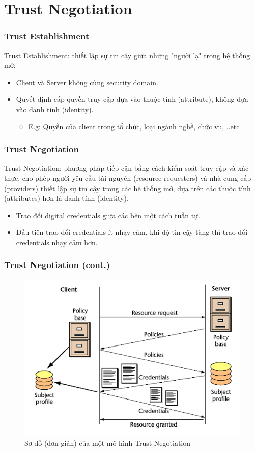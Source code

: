 \documentclass[11pt]{beamer}
\begin{document}
\section{Trust Negotiation}
\begin{frame}
\frametitle{Trust Establishment}
Trust Establishment: thiết lập sự tin cậy giữa những "người lạ" trong hệ thống mở:
\begin{itemize}
\item Client và Server không cùng security domain.
\item Quyết định cấp quyền truy cập dựa vào thuộc tính (attribute), không dựa vào danh tính (identity).
\begin{itemize}
\item E.g: Quyền của client trong tổ chức, loại ngành nghề, chức vụ, ..etc
\end{itemize}
\end{itemize}
\end{frame}

\begin{frame}
\frametitle{Trust Negotiation}
Trust Negotiation: phuơng pháp tiếp cận bằng cách kiểm soát truy cập và xác thực, cho phép người yêu cầu tài nguyên (resource requesters) và nhà cung cấp (providers) thiết lập sự tin cậy trong các hệ thống mở, dựa trên các thuộc tính (attributes) hơn là danh tính (identity).
\begin{itemize}
\item Trao đổi digital credentials giữa các bên một cách tuần tự.
\item Đầu tiên trao đổi credentials ít nhạy cảm, khi độ tin cậy tăng thì trao đổi credentials nhạy cảm hơn.
\end{itemize}
\end{frame}


\begin{frame}
\frametitle{Trust Negotiation (cont.)}
\begin{figure}[H]
\centering
\includegraphics[scale=.4]{img/trust-simple.png}
\caption{Sơ đồ (đơn giản) của một mô hình Trust Negotiation}
\end{figure}
\end{frame}
\end{document}
